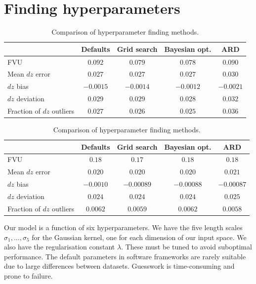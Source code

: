\documentclass[11pt,twoside,openright]{report}
\begin{document}
\section{Finding hyperparameters}
\begin{table}
\centering
\begin{subtable}{\textwidth}
\centering

\begin{tabular}{l | c c c c}
    & Defaults & Grid search & Bayesian opt. & ARD \\
    \hline
    FVU & $0.092$ & $0.079$ & $0.078$ & $0.090$ \\
    Mean $dz$ error & $0.027$ & $0.027$ & $0.027$ & $0.030$ \\
    $dz$ bias & $-0.0015$ & $-0.0014$ & $-0.0012$ & $-0.0021$ \\
    $dz$ deviation & $0.029$ & $0.029$ & $0.028$ & $0.032$ \\
    Fraction of $dz$ outliers & $0.027$ & $0.026$ & $0.025$ & $0.036$
  \end{tabular}

\caption{Hyperparameter selection performance for SDSS.}
\end{subtable}


\begin{subtable}{\textwidth}
\centering

\begin{tabular}{l | c c c c}
    & Defaults & Grid search & Bayesian opt. & ARD \\
    \hline
    FVU & $0.18$ & $0.17$ & $0.18$ & $0.18$ \\
    Mean $dz$ error & $0.020$ & $0.020$ & $0.020$ & $0.021$ \\
    $dz$ bias & $-0.0010$ & $-0.00089$ & $-0.00088$ & $-0.00087$ \\
    $dz$ deviation & $0.024$ & $0.024$ & $0.024$ & $0.025$ \\
    Fraction of $dz$ outliers & $0.0062$ & $0.0059$ & $0.0062$ & $0.0058$
  \end{tabular}

\caption{Hyperparameter selection performance for 2dFLenS.}
\end{subtable}

\caption{Comparison of hyperparameter finding methods.}
\label{table:hyperparameter_comp}
\end{table}

Our model is a function of six hyperparameters. We have the five length scales $\sigma_1, \dots, \sigma_5$ for the Gaussian kernel, one for each dimension of our input space. We also have the regularisation constant $\lambda$. These must be tuned to avoid suboptimal performance. The default parameters in software frameworks are rarely suitable due to large differences between datasets. Guesswork is time-consuming and prone to failure.
\end{document}

